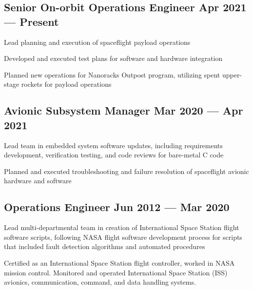 \documentclass[letter,10pt]{article}
\begin{document}
\subsection{{Senior On-orbit Operations Engineer \hfill Apr 2021 --- Present}}
\begin{zitemize}
\item Lead planning and execution of spaceflight payload operations
\item Developed and executed test plans for software and hardware integration
\item Planned new operations for Nanoracks Outpost program, utilizing spent upper-stage rockets for payload operations
\end{zitemize}

\subsection{{Avionic Subsystem Manager \hfill Mar 2020 --- Apr 2021}}
\begin{zitemize}
\item Lead team in embedded system software updates, including requirements development, verification testing, and code reviews for bare-metal C code
\item Planned and executed troubleshooting and failure resolution of spaceflight avionic hardware and software
\end{zitemize}

\subsection{{Operations Engineer \hfill Jun 2012 --- Mar 2020}}
\begin{zitemize}
\item Lead multi-departmental team in creation of International Space Station flight software scripts, following NASA flight software development process for scripts that included fault detection algorithms and automated procedures
\item Certified as an International Space Station flight controller, worked in NASA mission control.
Monitored and operated International Space Station (ISS) avionics, communication, command, and
data handling systems.
\end{zitemize}
\end{document}
